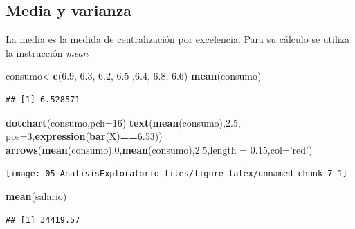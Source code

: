 \documentclass[]{book}
\newenvironment{Shaded}{\begin{snugshade}}{\end{snugshade}}
\newcommand{\KeywordTok}[1]{\textcolor[rgb]{0.13,0.29,0.53}{\textbf{#1}}}
\newcommand{\DataTypeTok}[1]{\textcolor[rgb]{0.13,0.29,0.53}{#1}}
\newcommand{\DecValTok}[1]{\textcolor[rgb]{0.00,0.00,0.81}{#1}}
\newcommand{\FloatTok}[1]{\textcolor[rgb]{0.00,0.00,0.81}{#1}}
\newcommand{\StringTok}[1]{\textcolor[rgb]{0.31,0.60,0.02}{#1}}
\newcommand{\OperatorTok}[1]{\textcolor[rgb]{0.81,0.36,0.00}{\textbf{#1}}}
\newcommand{\NormalTok}[1]{#1}
\begin{document}
\subsection{Media y varianza}\label{media-y-varianza}

La media es la medida de centralización por excelencia. Para su cálculo
se utiliza la instrucción \emph{mean}

\begin{Shaded}
\begin{Highlighting}[]
\NormalTok{consumo<-}\KeywordTok{c}\NormalTok{(}\FloatTok{6.9}\NormalTok{, }\FloatTok{6.3}\NormalTok{, }\FloatTok{6.2}\NormalTok{, }\FloatTok{6.5}\NormalTok{ ,}\FloatTok{6.4}\NormalTok{, }\FloatTok{6.8}\NormalTok{, }\FloatTok{6.6}\NormalTok{)}
\KeywordTok{mean}\NormalTok{(consumo)}
\end{Highlighting}
\end{Shaded}

\begin{verbatim}
## [1] 6.528571
\end{verbatim}

\begin{Shaded}
\begin{Highlighting}[]
\KeywordTok{dotchart}\NormalTok{(consumo,}\DataTypeTok{pch=}\DecValTok{16}\NormalTok{)}
\KeywordTok{text}\NormalTok{(}\KeywordTok{mean}\NormalTok{(consumo),}\FloatTok{2.5}\NormalTok{, }\DataTypeTok{pos=}\DecValTok{3}\NormalTok{,}\KeywordTok{expression}\NormalTok{(}\KeywordTok{bar}\NormalTok{(X)}\OperatorTok{==}\FloatTok{6.53}\NormalTok{))}
\KeywordTok{arrows}\NormalTok{(}\KeywordTok{mean}\NormalTok{(consumo),}\DecValTok{0}\NormalTok{,}\KeywordTok{mean}\NormalTok{(consumo),}\FloatTok{2.5}\NormalTok{,}\DataTypeTok{length =} \FloatTok{0.15}\NormalTok{,}\DataTypeTok{col=}\StringTok{'red'}\NormalTok{)}
\end{Highlighting}
\end{Shaded}

\begin{center}\texttt{[image: 05-AnalisisExploratorio\_files/figure-latex/unnamed-chunk-7-1]} \end{center}

\begin{Shaded}
\begin{Highlighting}[]
\KeywordTok{mean}\NormalTok{(salario)}
\end{Highlighting}
\end{Shaded}

\begin{verbatim}
## [1] 34419.57
\end{verbatim}
\end{document}

